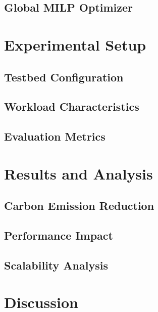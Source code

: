 \documentclass[journal]{IEEEtran}
\begin{document}
\subsection{Global MILP Optimizer}

\section{Experimental Setup}

\subsection{Testbed Configuration}

\subsection{Workload Characteristics}

\subsection{Evaluation Metrics}

\section{Results and Analysis}

\subsection{Carbon Emission Reduction}

\subsection{Performance Impact}

\subsection{Scalability Analysis}

\section{Discussion}
\end{document}
